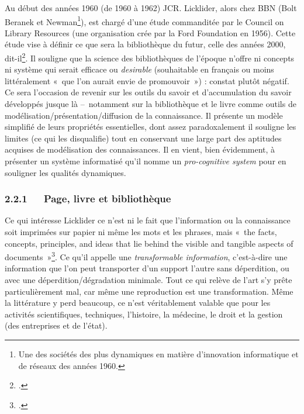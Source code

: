 \documentclass{FramateX}
\begin{document}
\begin{refsection}
Au début des années 1960 (de 1960 à 1962) JCR. Licklider, alors chez BBN
(Bolt Beranek et Newman\footnote{ Une des sociétés des plus dynamiques
en matière d'innovation informatique et de réseaux des années 1960.}),
est chargé d'une étude commanditée par le Council on Library
Resources (une organisation crée par la Ford Foundation en 1956).
Cette étude vise à définir ce que sera la bibliothèque du futur,
celle des années 2000, dit-il\footnote{\cite{lickliderlibraries1965}.}. Il souligne que la
science des bibliothèques de l'époque n'offre ni concepts ni système
qui serait efficace ou \textit{desirable} (souhaitable en français ou moins
littéralement «~que l'on aurait envie de promouvoir~») : constat plutôt
négatif. Ce sera l'occasion de revenir sur les outils du savoir et
d'accumulation du savoir développés jusque là --~notamment sur la
bibliothèque et le livre comme outils de
modélisation/présentation/diffusion de la connaissance. Il présente un
modèle simplifié de leurs propriétés essentielles, dont assez
paradoxalement il souligne les limites (ce qui les disqualifie) tout
en conservant une large part des aptitudes acquises de modélisation des
connaissances. Il en vient, bien évidemment, à présenter un système
informatisé qu'il nomme un \textit{pro-cognitive system} pour en souligner
les qualités dynamiques.




\subsubsection*{2.2.1~~~Page, livre et bibliothèque}
{}



Ce qui intéresse Licklider ce n'est ni le fait que l'information ou
la connaissance soit imprimées sur papier ni même les mots et les
phrases, mais «~the facts, concepts, principles, and ideas that lie
behind the visible and tangible aspects of documents~»\footnote{\cite[p.~2]{lickliderlibraries1965}.}. Ce qu'il
appelle une \textit{transformable information}, c'est-à-dire une information
que l'on peut transporter d'un support l'autre sans déperdition, ou
avec une déperdition/dégradation minimale. Tout ce qui relève de l'art
s'y prête particulièrement mal, car même une reproduction est une
transformation. Même la littérature y perd beaucoup, ce n'est
véritablement valable que pour les activités scientifiques, techniques,
l'histoire, la médecine, le droit et la gestion (des entreprises et de
l'état).



\end{refsection}
\end{document}
